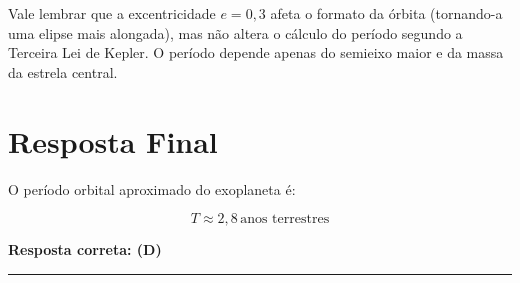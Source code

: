 \documentclass[a4paper,12pt]{article}
\begin{document}
\begin{flushleft}
Vale lembrar que a excentricidade \(e = 0{,}3\) afeta o formato da órbita (tornando-a uma elipse mais alongada), mas não altera o cálculo do período segundo a Terceira Lei de Kepler. O período depende apenas do semieixo maior e da massa da estrela central.

\section*{Resposta Final}

O período orbital aproximado do exoplaneta é:

\[
\boxed{T \approx 2,8\,\text{anos terrestres}}
\]

\textbf{Resposta correta: \colorbox{green!50}{(D)}}

\end{flushleft}

\noindent\rule{\linewidth}{0.6pt}\\
\end{document}
